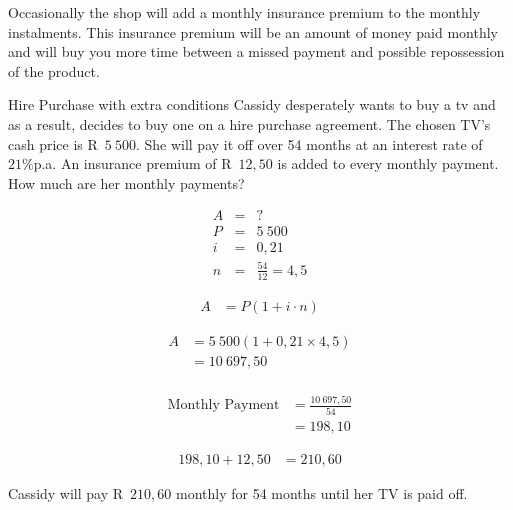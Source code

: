 Occasionally the shop will add a monthly insurance premium to the monthly instalments. This insurance premium will be an amount of money paid monthly and will buy you more time between a missed payment and possible repossession of the product.


\begin{wex}{Hire Purchase with extra conditions}{
    Cassidy desperately wants to buy a tv and as a result, decides to buy one on a hire purchase agreement. The chosen TV’s cash price is R~$5~500$. She will pay it off over 54 months at an interest rate of $21\%$p.a. An insurance premium of R~$12,50$ is added to every monthly payment. How much are her monthly payments?}{

    \begin{eqnarray*}
	A &=& ?\\
	P &=& 5~500\\
	i &=& 0,21\\
	n &=& \frac{54}{12} = 4,5
    \end{eqnarray*}

    \begin{align*}
	    A &= P(1 + i \cdot n)
    \end{align*}

    \begin{align*}
	A &= 5~500(1 + 0,21 \times 4,5)\\
	  &= 10~697,50\\
    \end{align*}

    \begin{align*}
	\text{Monthly Payment} &= \frac{10~697,50}{54}\\
			&= 198,10
    \end{align*}

    \begin{align*}
	198,10 + 12,50 &= 210,60
    \end{align*}

    Cassidy will pay R~$210,60$ monthly for 54 months until her TV is paid off.
}
\end{wex}




